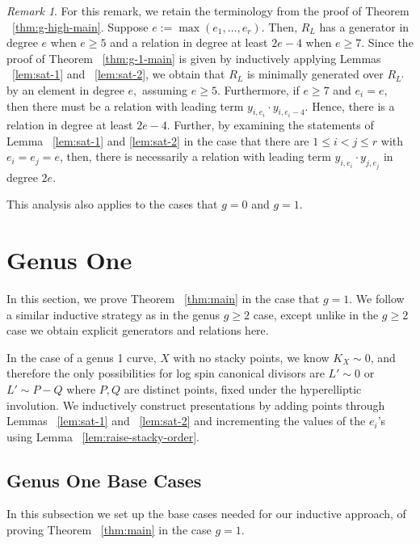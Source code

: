 \documentclass{amsart}
\theoremstyle{plain}
\theoremstyle{definition}
\theoremstyle{remark}
\newtheorem{rem}[thm]{Remark}
\numberwithin{equation}{section}
\newcommand\ssec{\subsection}
\newcommand{\halfcan}{L}
\begin{document}
\begin{rem}
\label{rem:genus-2-explicit-bound}
For this remark, we retain the terminology from the proof of Theorem ~\ref{thm:g-high-main}.
Suppose $e :=  \max(e_1,\ldots, e_r).$ Then, $R_L$ has a generator in degree $e$ when $e \geq 5$ and a relation in degree at least $2e-4$ when $e \geq 7$. Since the proof of Theorem ~\ref{thm:g-1-main} is given by inductively 
applying Lemmas ~\ref{lem:sat-1} and ~\ref{lem:sat-2}, we obtain that $R_L$ is minimally generated over $R_{L'}$ by an element in degree $e,$ assuming $e \geq 5$. Furthermore, if $e \geq 7$ and $e_i = e,$ 
then there must be a relation with leading term $y_{i,e_i} \cdot y_{i,e_i-4}.$ Hence, there is a relation in degree at least $2e - 4$. 
Further, by examining the statements of Lemma ~\ref{lem:sat-1} and \ref{lem:sat-2} in the case that there are $1 \leq i < j \leq r$ with $e_i = e_j = e$, then, there is necessarily a relation with leading term $y_{i, e_i} \cdot y_{j, e_j}$ in degree $2e$.

This analysis also applies to the cases that $g = 0$ and $g = 1$.
\end{rem}




\section{Genus One}
\label{sec:g-1}

In this section, we prove Theorem ~\ref{thm:main} in the case that $g = 1$.  We follow a similar inductive strategy as in the genus $g\geq 2$ case, except unlike in the $g \geq 2$ case we obtain explicit generators and relations here.

In the case of a genus 1 curve, $X$ with no stacky points, we know $K_X \sim 0$, and therefore the only possibilities for log spin canonical divisors are $\halfcan' \sim 0$ or $\halfcan' \sim P - Q$ where $P, Q$ are distinct points, fixed  under the hyperelliptic involution. We inductively construct presentations by adding points through Lemmas ~\ref{lem:sat-1} and ~\ref{lem:sat-2} and incrementing the values of the $e_i$'s using Lemma ~\ref{lem:raise-stacky-order}.

\ssec{Genus One Base Cases}
\label{ssec:g-1_base}
In this subsection we set up the base cases needed for our inductive approach, of proving Theorem ~\ref{thm:main} in the case $g = 1$.
\end{document}
